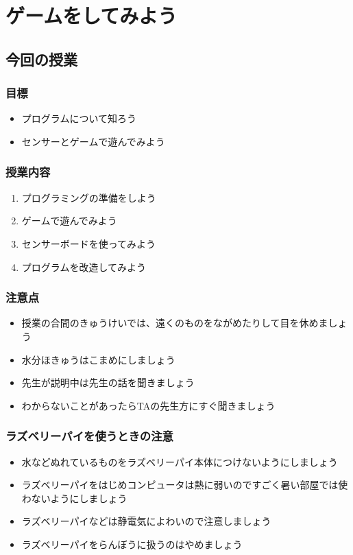 \chapter{ゲームをしてみよう}
\section{今回の授業}
\subsection{目標}
\begin{itemize}
  \item プログラムについて知ろう
  \item センサーとゲームで遊んでみよう
\end{itemize}

\subsection{授業内容}
\begin{enumerate}
  \item プログラミングの準備をしよう
  \item ゲームで遊んでみよう
  \item センサーボードを使ってみよう
  \item プログラムを改造してみよう
\end{enumerate}

\subsection{注意点}
\begin{itemize}
  \item 授業の合間のきゅうけいでは、遠くのものをながめたりして目を休めましょう
  \item 水分ほきゅうはこまめにしましょう
  \item 先生が説明中は先生の話を聞きましょう
  \item わからないことがあったらTAの先生方にすぐ聞きましょう
\end{itemize}

\subsection{ラズベリーパイを使うときの注意}
\begin{itemize}
  \item 水などぬれているものをラズベリーパイ本体につけないようにしましょう
  \item ラズベリーパイをはじめコンピュータは熱に弱いのですごく暑い部屋では使わないようにしましょう
  \item ラズベリーパイなどは静電気によわいので注意しましょう
  \item ラズベリーパイをらんぼうに扱うのはやめましょう
\end{itemize}
\clearpage


